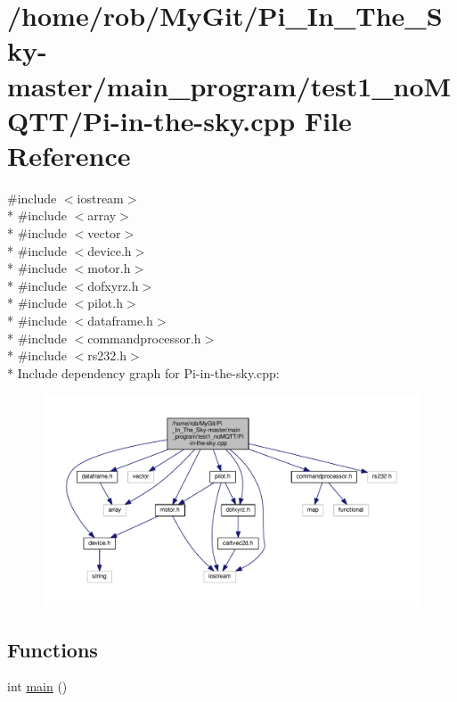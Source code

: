 \hypertarget{test1__no_m_q_t_t_2_pi-in-the-sky_8cpp}{}\section{/home/rob/\+My\+Git/\+Pi\+\_\+\+In\+\_\+\+The\+\_\+\+Sky-\/master/main\+\_\+program/test1\+\_\+no\+M\+Q\+T\+T/\+Pi-\/in-\/the-\/sky.cpp File Reference}
\label{test1__no_m_q_t_t_2_pi-in-the-sky_8cpp}
{\ttfamily \#include $<$iostream$>$}\\*
{\ttfamily \#include $<$array$>$}\\*
{\ttfamily \#include $<$vector$>$}\\*
{\ttfamily \#include $<$device.\+h$>$}\\*
{\ttfamily \#include $<$motor.\+h$>$}\\*
{\ttfamily \#include $<$dofxyrz.\+h$>$}\\*
{\ttfamily \#include $<$pilot.\+h$>$}\\*
{\ttfamily \#include $<$dataframe.\+h$>$}\\*
{\ttfamily \#include $<$commandprocessor.\+h$>$}\\*
{\ttfamily \#include $<$rs232.\+h$>$}\\*
Include dependency graph for Pi-\/in-\/the-\/sky.cpp\+:\nopagebreak
\begin{figure}[H]
\begin{center}
\leavevmode
\includegraphics[width=350pt]{test1__no_m_q_t_t_2_pi-in-the-sky_8cpp__incl}
\end{center}
\end{figure}
\subsection*{Functions}
\begin{DoxyCompactItemize}
\item 
int \hyperlink{test1__no_m_q_t_t_2_pi-in-the-sky_8cpp_ae66f6b31b5ad750f1fe042a706a4e3d4}{main} ()
\end{DoxyCompactItemize}
